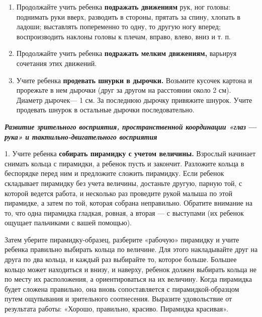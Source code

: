 \documentclass{book}
\renewcommand{\emph}[1]{\textit{#1}}
\begin{document}
\begin{enumerate}
\def\labelenumi{\arabic{enumi}.}
\setcounter{enumi}{4}
\item
  
  Продолжайте учить ребенка \textbf{подражать движениям} рук, ног
  головы: поднимать руки вверх, разводить в стороны, прятать за спину,
  хлопать в ладоши; выставлять попеременно то одну, то другую ногу
  вперед; воспроизводить наклоны головы к плечам, вправо, влево, вниз и
  т. п.
  
\item
  
  Продолжайте учить ребенка \textbf{подражать мелким движениям,}
  варьируя сочетания этих движений.
  
\item
  
  Учите ребенка \textbf{продевать шнурки в дырочки.} Возьмите кусочек
  картона и прорежьте в нем дырочки (друг за другом на расстоянии около
  2 см). Диаметр дырочек--- 1 см. За последнюю дырочку привяжите шнурок.
  Учите продевать шнурок в остальные дырочки последовательно.
  
\end{enumerate}


\textbf{\emph{Развитие зрительного восприятия, пространственной
координации «глаз} --- \emph{рука»} \emph{и тактильно-двигательного
восприятия}}

1. Учите ребенка \textbf{собирать пирамидку с учетом величины.} Взрослый
начинает снимать кольца с пирамидки, а ребенок пусть и закончит.
Разложите кольца в беспорядке перед ним и предложите сложить пирамидку.
Если ребенок складывает пирамидку без учета величины, достаньте другую,
парную той, с которой ведется работа, и несколько раз проведите рукой
малыша по этой пирамидке, а затем по той, которая собрана неправильно.
Обратите внимание на то, что одна пирамидка гладкая, ровная, а вторая
--- с выступами (их ребенок ощущает пальчиками с вашей помощью).

Затем уберите пирамидку-образец, разберите «рабочую» пирамидку и учите
ребенка правильно выбирать кольца по величине. Для этого накладывайте
друг на друга по два кольца, и каждый раз выбирайте то, которое больше.
Большее кольцо может находиться и внизу, и наверху, ребенок должен
выбирать кольца не по месту их расположения, а ориентироваться на их
величину. Когда пирамидка будет сложена правильно, она вновь
сопоставляется с пирамидкой-образцом путем ощупывания и зрительного
соотнесения. Выразите удовольствие от результата работы: «Хорошо,
правильно, красиво. Пирамидка красивая».
\end{document}
